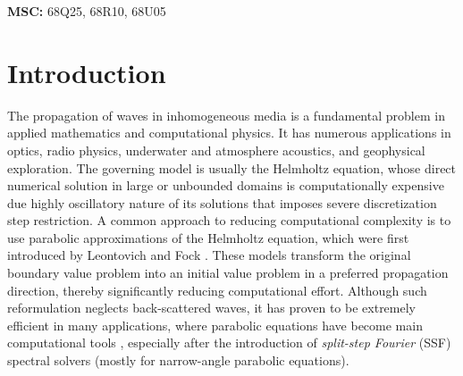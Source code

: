 \documentclass[11pt,a4paper]{article}
\theoremstyle{plain}%
\theoremstyle{definition}
\theoremstyle{remark}
\begin{document}
\textbf{MSC:}
68Q25, 68R10, 68U05



\section*{Introduction}
The propagation of waves in inhomogeneous media is a fundamental problem in applied mathematics and computational physics.
It has numerous applications in optics, radio physics, underwater and atmosphere acoustics, and geophysical exploration. 
The governing model is usually the Helmholtz equation, whose direct numerical solution in large or unbounded domains is computationally expensive due highly oscillatory nature of its solutions that imposes severe discretization step restriction.
%
A common approach to reducing computational complexity is to use parabolic approximations of the Helmholtz equation, which were first introduced by Leontovich and Fock \cite{leontovich1946, vlasov1995parabolic}. 
These models transform the original boundary value problem into an initial value problem in a preferred propagation direction, thereby significantly reducing computational effort. 
Although such reformulation neglects back-scattered waves, it has proven to be extremely efficient in many applications, where parabolic equations have become main computational tools \cite{claerbout1976, jensen2011computational, levy2000parabolic, lu2006some}, especially after the introduction of \textit{split-step Fourier} (SSF) spectral solvers (mostly for narrow-angle parabolic equations). 
 
\end{document}
